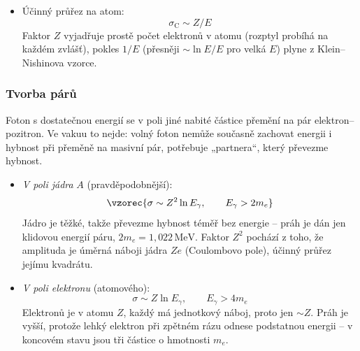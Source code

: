 \begin{itemize}
  \item Účinný průřez na atom:
  \[
    \sigma_{\text{C}} \sim Z/E
  \]
  Faktor \(Z\) vyjadřuje prostě počet elektronů v atomu (rozptyl probíhá na
  každém zvlášť), pokles \(1/E\) (přesněji \(\sim \ln E/E\) pro velká \(E\))
  plyne z Klein–Nishinova vzorce.
\end{itemize}

\subsubsection{Tvorba párů}
Foton s dostatečnou energií se v poli jiné nabité částice přemění na pár
elektron–pozitron. Ve vakuu to nejde: volný foton nemůže současně zachovat
energii i hybnost při přeměně na masivní pár, potřebuje „partnera``, který
převezme hybnost.

\begin{center}
\end{center}

\begin{itemize}
  \item \emph{V poli jádra} \(A\) (pravděpodobnější):
  \[
    \vzorec{\sigma \sim Z^2 \ln E_\gamma, \qquad E_\gamma > 2m_e}
  \]
  Jádro je těžké, takže převezme hybnost téměř bez energie – práh je dán
  jen klidovou energií páru, \(2m_e = 1{,}022\,\text{MeV}\). Faktor \(Z^2\)
  pochází z toho, že amplituda je úměrná náboji jádra \(Ze\) (Coulombovo
  pole), účinný průřez jejímu kvadrátu.
  \item \emph{V poli elektronu} (atomového):
  \[
    \sigma \sim Z \ln E_\gamma, \qquad E_\gamma > 4m_e
  \]
  Elektronů je v atomu \(Z\), každý má jednotkový náboj, proto jen \(\sim Z\).
  Práh je vyšší, protože lehký elektron při zpětném rázu odnese podstatnou
  energii – v koncovém stavu jsou tři částice o hmotnosti \(m_e\).
\end{itemize}

